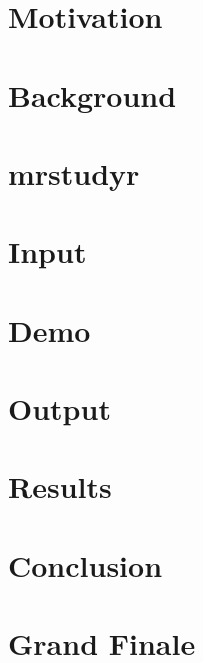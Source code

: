 \documentclass[hyperref]{beamer}
\title{\fontsize{50}{50}\selectfont{mrstudyr}}
\subtitle{Retrospective Mutant Reduction}
\author[McCurdy]{Colton J. McCurdy\\
{\small \href{https://twitter.com/McCurdyColton}{\textcolor{solarizedOrange}{\fontsize{15}{30}{\faTwitter\,}\small McCurdyColton}}}}
\institute[ICSME 2016]{ICSME 2016}
\date[September 23, 2016]{October 6, 2016}
\begin{document}
\begin{frame}
  \titlepage
\end{frame}

\section{Motivation}


\section{Background}


\section{mrstudyr}


\section{Input}


\section{Demo}


\section{Output}


\section{Results}


\section{Conclusion}


% 

\section{Grand Finale}

\end{document}
